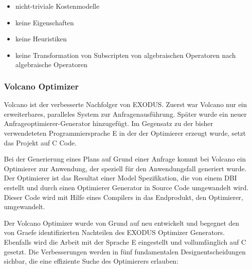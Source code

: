 \begin{itemize}
\item nicht-triviale Kostenmodelle
\item keine Eigenschaften
\item keine Heuristiken
\item keine Transformation von Subscripten von algebraischen Operatoren nach algebraische Operatoren
\end{itemize}


\subsubsection{Volcano Optimizer}

Volcano ist der verbesserte Nachfolger von EXODUS. Zuerst war Volcano nur ein erweiterbares, paralleles System zur Anfragenausführung. Später wurde ein neuer Anfrageoptimierer-Generator hinzugefügt. Im Gegensatz zu der bisher verwendeteten Programmiersprache E in der der Optimierer erzeugt wurde, setzt das Projekt auf C Code. 


Bei der Generierung eines Plans auf Grund einer Anfrage kommt bei Volcano ein Optimierer zur Anwendung, der speziell für den Anwendungsfall generiert wurde. Der Optimierer ist das Resultat einer Model Spezifikation, die von einem \ac{DBI} erstellt und durch einen Optimierer Generator in Source Code umgewandelt wird. Dieser Code wird mit Hilfe eines Compilers in das Endprodukt, den Optimierer, umgewandelt.


Der Volcano Optimizer wurde von Grund auf neu entwickelt und begegnet den von Graefe identifizierten Nachteilen des EXODUS Optimizer Generators. Ebenfalls wird die Arbeit mit der Sprache E eingestellt und vollumfänglich auf C gesetzt. Die Verbesserungen werden in fünf fundamentalen Designentscheidungen\cite{graefe1993volcano} sichbar, die eine effiziente Suche des Optimierers erlauben:


